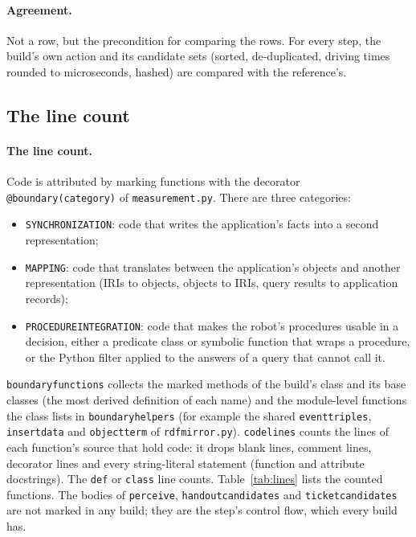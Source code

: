 \documentclass[10pt]{article}
\newcommand{\brkunderscore}{\textunderscore\allowbreak}
\newcommand{\code}[1]{{\let\_\brkunderscore\texttt{#1}}}
\newcommand{\file}[1]{{\let\_\brkunderscore\texttt{#1}}}
\begin{document}
\paragraph{Agreement.} Not a row, but the precondition for comparing the rows. For every step, the build's own action
and its candidate sets (sorted, de-duplicated, driving times rounded to microseconds, hashed) are compared with the
reference's.

\subsection{The line count}
\label{sec:lines}

\paragraph{The line count.} Code is attributed by marking functions with the decorator
\code{@boundary(category)} of \file{measurement.py}. There are three categories:
\begin{itemize}
  \item \code{SYNCHRONIZATION}: code that writes the application's facts into a second representation;
  \item \code{MAPPING}: code that translates between the application's objects and another representation (IRIs to
        objects, objects to IRIs, query results to application records);
  \item \code{PROCEDURE\_INTEGRATION}: code that makes the robot's procedures usable in a decision, either a predicate
        class or symbolic function that wraps a procedure, or the Python filter applied to the answers of a query that
        cannot call it.
\end{itemize}
\code{boundary\_functions} collects the marked methods of the build's class and its base classes (the most derived
definition of each name) and the module-level functions the class lists in \code{boundary\_helpers} (for example the
shared \code{event\_triples}, \code{insert\_data} and \code{object\_term} of \file{rdf\_mirror.py}).
\code{code\_lines} counts the lines of each function's source that hold code: it drops blank lines, comment lines,
decorator lines and every string-literal statement (function and attribute docstrings). The \code{def} or \code{class}
line counts. Table~\ref{tab:lines} lists the counted functions. The bodies of \code{perceive},
\code{handout\_candidates} and \code{ticket\_candidates} are not marked in any build; they are the step's control flow,
which every build has.
\end{document}
